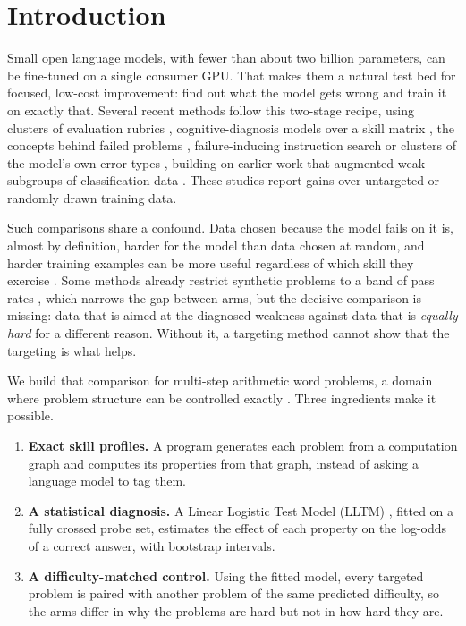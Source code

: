 \documentclass[11pt]{article}
\begin{document}
\section{Introduction}

Small open language models, with fewer than about two billion parameters, can be fine-tuned on a single consumer GPU.
That makes them a natural test bed for focused, low-cost improvement: find out what the model gets wrong and train it on
exactly that. Several recent methods follow this two-stage recipe, using clusters of evaluation rubrics
\citep{gupta2026craft}, cognitive-diagnosis models over a skill matrix \citep{zhao2025cds,luo2026kite}, the concepts
behind failed problems \citep{liang2025sws}, failure-inducing instruction search \citep{li2024reversegen} or clusters of
the model's own error types \citep{yu2025selferror}, building on earlier work that augmented weak subgroups of
classification data \citep{he2023tdg}. These studies report gains over untargeted or randomly drawn training data.

Such comparisons share a confound. Data chosen because the model fails on it is, almost by definition, harder for the
model than data chosen at random, and harder training examples can be more useful regardless of which skill they
exercise \citep{sorscher2022pruning}. Some methods already restrict synthetic problems to a band of pass rates
\citep{liang2025sws}, which narrows the gap between arms, but the decisive comparison is missing: data that is aimed at
the diagnosed weakness against data that is \emph{equally hard} for a different reason. Without it, a targeting method
cannot show that the targeting is what helps.

We build that comparison for multi-step arithmetic word problems, a domain where problem structure can be controlled
exactly \citep{ye2025physics,mirzadeh2024gsmsymbolic}. Three ingredients make it possible.
\begin{enumerate}
  \item \textbf{Exact skill profiles.} A program generates each problem from a computation graph and computes its
  properties from that graph, instead of asking a language model to tag them.
  \item \textbf{A statistical diagnosis.} A Linear Logistic Test Model (LLTM) \citep{fischer1973lltm}, fitted on a
  fully crossed probe set, estimates the effect of each property on the log-odds of a correct answer, with bootstrap
  intervals.
  \item \textbf{A difficulty-matched control.} Using the fitted model, every targeted problem is paired with another
  problem of the same predicted difficulty, so the arms differ in why the problems are hard but not in how hard they
  are.
\end{enumerate}
\end{document}
